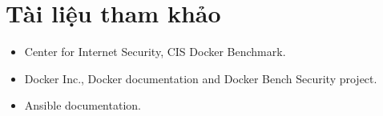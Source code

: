 \section*{Tài liệu tham khảo}
\label{tai-lieu-tham-khao}

\begin{itemize}
\item Center for Internet Security, CIS Docker Benchmark.
\item Docker Inc., Docker documentation and Docker Bench Security project.
\item Ansible documentation.
\end{itemize}
